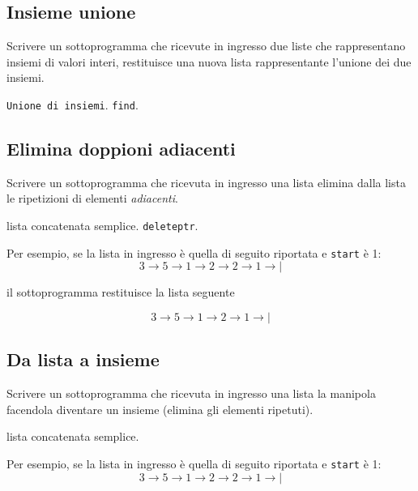 \subsection{Insieme unione}
Scrivere un sottoprogramma che ricevute in ingresso due liste che rappresentano insiemi di valori interi, restituisce una nuova lista rappresentante l'unione dei due insiemi.

\begin{tags}
\texttt{Unione di insiemi}. 
\texttt{find}.
\end{tags}


\subsection{Elimina doppioni adiacenti}
Scrivere un sottoprogramma che ricevuta in ingresso una lista elimina dalla lista le ripetizioni di elementi \textit{adiacenti}. 

\begin{tags}
lista concatenata semplice. 
\texttt{deleteptr}.
\end{tags}


Per esempio, se la lista in ingresso \`e quella di seguito riportata e \texttt{start} \`e 1:
$$
3 \rightarrow 5 \rightarrow 1 \rightarrow 2  \rightarrow 2 \rightarrow 1 \rightarrow|
$$ 

il sottoprogramma restituisce la lista seguente

$$
3 \rightarrow 5 \rightarrow 1 \rightarrow 2 \rightarrow 1 \rightarrow|
$$ 



\subsection{Da lista a insieme}
Scrivere un sottoprogramma che ricevuta in ingresso una lista la manipola facendola diventare un insieme (elimina gli elementi ripetuti). 

\begin{tags}
lista concatenata semplice. 
\end{tags}


Per esempio, se la lista in ingresso \`e quella di seguito riportata e \texttt{start} \`e 1:
$$
3 \rightarrow 5 \rightarrow 1 \rightarrow 2  \rightarrow 2 \rightarrow 1 \rightarrow|
$$ 

